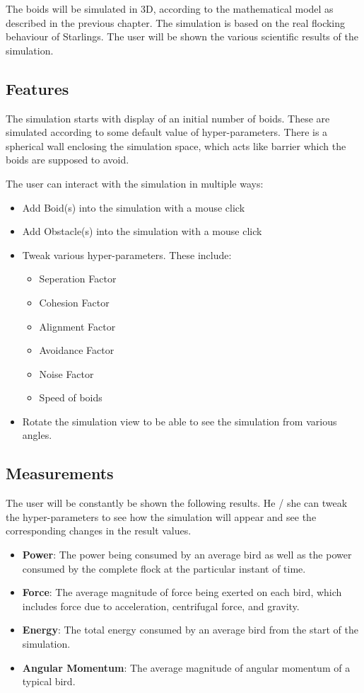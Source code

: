 \documentclass[a4paper,12pt,openany]{book}
\begin{document}
The boids will be simulated in 3D, according to the mathematical model as described in the previous chapter. The simulation is based on the real flocking behaviour of Starlings. The user will be shown the various scientific results of the simulation.

\subsection*{Features}

The simulation starts with display of an initial number of boids. These are simulated according to some default value of hyper-parameters. There is a spherical wall enclosing the simulation space, which acts like barrier which the boids are supposed to avoid.

The user can interact with the simulation in multiple ways:
\begin{itemize}

\item Add Boid(s) into the simulation with a mouse click
\item Add Obstacle(s) into the simulation with a mouse click
\item Tweak various hyper-parameters. These include:
\begin{itemize}
\item Seperation Factor
\item Cohesion Factor
\item Alignment Factor
\item Avoidance Factor
\item Noise Factor
\item Speed of boids
\end{itemize} 

\item Rotate the simulation view to be able to see the simulation from various angles.

\end{itemize}

\subsection*{Measurements}
The user will be constantly be shown the following results. He / she can tweak the hyper-parameters to see how the simulation will appear and see the corresponding changes in the result values.
\begin{itemize}
\item \textbf{Power}: The power being consumed by an average bird as well as the power consumed by the complete flock at the particular instant of time.
\item \textbf{Force}: The average magnitude of force being exerted on each bird, which includes force due to acceleration, centrifugal force, and gravity.
\item \textbf{Energy}: The total energy consumed by an average bird from the start of the simulation.
\item \textbf{Angular Momentum}: The average magnitude of angular momentum of a typical bird.
\end{itemize}
\end{document}
